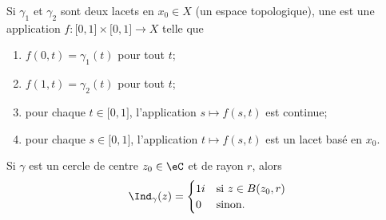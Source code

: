\begin{definition}  \label{DefECnFJQp}
	Si \( \gamma_1\) et \( \gamma_2\) sont deux lacets en \( x_0\in X\) (un espace topologique), une  est une application \( f\colon \mathopen[ 0 , 1 \mathclose]\times \mathopen[ 0 , 1 \mathclose]\to X\) telle que
	\begin{enumerate}
		\item
		      \( f(0,t)=\gamma_1(t)\) pour tout \( t\);
		\item
		      \( f(1,t)=\gamma_2(t)\) pour tout \( t\);
		\item
		      pour chaque \( t\in \mathopen[ 0 , 1 \mathclose]\), l'application \( s\mapsto f(s,t)\) est continue;
		\item
		      pour chaque \( s\in \mathopen[ 0 , 1 \mathclose]\), l'application \( t\mapsto f(s,t)\) est un lacet basé en \( x_0\).
	\end{enumerate}
\end{definition}


\begin{lemma} 		\label{LEMooMEICooOOGzdf}
	Si \( \gamma\) est un cercle de centre \( z_0\in \eC\) et de rayon \( r\), alors
	\begin{equation}
		\Ind_{\gamma}(z)=\begin{cases}
			1 i & \text{si } z\in B(z_0,r) \\
			0   & \text{sinon}.
		\end{cases}
	\end{equation}
\end{lemma}

